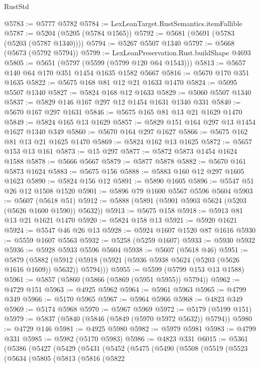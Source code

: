 \begin{lexlean}{RustStd}
\begin{coremodule}
@5783 := @5777 @5782
@5784 := LexLeanTarget.RustSemantics.itemFallible
@5787 := @5204 (@5205 (@5784 @1565))
@5792 := @5681 (@5691 (@5783 (@5203 (@5787 @1340))))
@5794 := @5267 @5507 @1340
@5797 := @5668 (@5673 (@5792 @5794))
@5799 := LexLeanPreservation.Rust.buildShape @4693
@5805 := @5651 (@5797 (@5599 (@5799 @120 @64 @1543)))
@5813 := @5657 @140 @64 @170 @351 @1454 @1635 @1582 @5667
@5816 := @5670 @170 @351 @1635
@5822 := @5675 @168 @81 @12 @21 @1633 @1470
@5824 := @5095 @5507 @1340
@5827 := @5824 @168 @12 @1633
@5829 := @5060 @5507 @1340
@5837 := @5829 @146 @167 @297 @12 @1454 @1631 @1340 @331
@5840 := @5670 @167 @297 @1631
@5846 := @5675 @165 @81 @13 @21 @1629 @1470
@5849 := @5824 @165 @13 @1629
@5857 := @5829 @151 @164 @297 @13 @1454 @1627 @1340 @349
@5860 := @5670 @164 @297 @1627
@5866 := @5675 @162 @81 @13 @21 @1625 @1470
@5869 := @5824 @162 @13 @1625
@5872 := @5657 @153 @13 @161
@5873 := @15 @297
@5877 := @5872 @5873 @1454 @1624 @1588
@5878 := @5666 @5667
@5879 := @5877 @5878
@5882 := @5670 @161 @5873 @1624
@5883 := @5675 @156
@5888 := @5883 @160 @12 @297 @1605 @1623
@5890 := @5824 @156 @12
@5891 := @5890 @1605
@5896 := @5547 @51 @26 @12 @1508 @1520
@5901 := @5896 @79 @1600 @5567 @5596 @5604
@5903 := @5607 (@5618 @51)
@5912 := @5888 (@5891 (@5901 @5903 @5624 (@5203 (@5626 @1600 @1590)) @5632))
@5913 := @5675 @158
@5918 := @5913 @81 @13 @21 @1621 @1470
@5920 := @5824 @158 @13
@5921 := @5920 @1621
@5924 := @5547 @46 @26 @13
@5928 := @5924 @1607 @1520 @87 @1616
@5930 := @5559 @1607 @5563
@5932 := @5258 (@5259 @1607)
@5933 := @5930 @5932
@5936 := @5928 @5933 @5596 @5604
@5938 := @5607 (@5618 @46)
@5951 := @5879
    (@5882 (@5912 (@5918 (@5921 (@5936 @5938 @5624 (@5203 (@5626 @1616 @1609)) @5632)) @5794)))
@5955 := @5599 (@5799 @153 @13 @1588)
@5961 := @5857 (@5860 (@5866 (@5869 (@5951 @5955)) @5794))
@5962 := @4729 @151
@5963 := @4925 @5962
@5964 := @5961 @5963
@5965 := @4799 @349
@5966 := @5170 @5965
@5967 := @5964 @5966
@5968 := @4823 @349
@5969 := @5174 @5968
@5970 := @5967 @5969
@5972 := @5179 (@5199 @151)
@5979 := @5837 (@5840 (@5846 (@5849 (@5970 @5972 @5632)) @5794))
@5980 := @4729 @146
@5981 := @4925 @5980
@5982 := @5979 @5981
@5983 := @4799 @331
@5985 := @5982 (@5170 @5983)
@5986 := @4823 @331
@6015 := @5361
    (@5386
      (@5427
        (@5429
          (@5431
            (@5452
              (@5475
                (@5490
                  (@5508
                    (@5519
                      (@5523
                        (@5634
                          (@5805
                            (@5813
                              (@5816
                                (@5822

\end{coremodule}
\end{lexlean}
